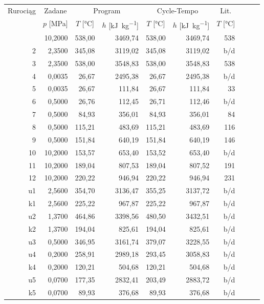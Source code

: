 \begin{longtable}{|*{10}{r|}}
	\hline
		\multirow{2}{*}{Rurociąg} &
		\multicolumn{1}{c|}{Zadane} &
		\multicolumn{2}{c|}{Program} &
		\multicolumn{2}{c|}{Cycle-Tempo} &
		\multicolumn{1}{c|}{Lit.} \\
	\cline{2-7}
		&
		\multicolumn{1}{c|}{$p$ [\si{\mega\pascal}]} &
		\multicolumn{1}{c|}{$T$ [\si{\degreeCelsius}]} &
		\multicolumn{1}{c|}{$h$ [\si{\kilo\joule\per\kilogram}]} &
		\multicolumn{1}{c|}{$T$ [\si{\degreeCelsius}]} &
		\multicolumn{1}{c|}{$h$ [\si{\kilo\joule\per\kilogram}]} &
		\multicolumn{1}{c|}{$T$ [\si{\degreeCelsius}]} \\
	\hline
	\endhead
	\hline
	\endfoot
		 1 & 10,2000 & 538,00 & 3469,74 & 538,00 & 3469,74 & 538 \\
		 2 &  2,3500 & 345,08 & 3119,02 & 345,08 & 3119,02 & b/d \\
		 3 &  2,3500 & 538,00 & 3548,83 & 538,00 & 3548,83 & 538 \\
		 4 &  0,0035 &  26,67 & 2495,38 &  26,67 & 2495,38 & b/d \\
		 5 &  0,0035 &  26,67 &  111,84 &  26,67 &  111,84 &  33 \\
		 6 &  0,5000 &  26,76 &  112,45 &  26,71 &  112,46 & b/d \\
		 7 &  0,5000 &  84,93 &  356,01 &  84,93 &  356,01 &  84 \\
		 8 &  0,5000 & 115,21 &  483,69 & 115,21 &  483,69 & 116 \\
		 9 &  0,5000 & 151,84 &  640,19 & 151,84 &  640,19 & 146 \\
		10 & 10,2000 & 153,57 &  653,40 & 153,52 &  653,40 & b/d \\
		11 & 10,2000 & 189,04 &  807,53 & 189,04 &  807,52 & 191 \\
		12 & 10,2000 & 220,22 &  946,94 & 220,22 &  946,94 & 231 \\
		u1 &  2,5600 & 354,70 & 3136,47 & 355,25 & 3137,72 & b/d \\
		k1 &  2,5600 & 225,22 &  967,87 & 225,22 &  967,87 & b/d \\
		u2 &  1,3700 & 464,86 & 3398,56 & 480,50 & 3432,51 & b/d \\
		k2 &  1,3700 & 194,04 &  825,61 & 194,04 &  825,61 & b/d \\
		u3 &  0,5000 & 346,95 & 3161,74 & 379,07 & 3228,55 & b/d \\
		u4 &  0,2000 & 258,91 & 2989,18 & 293,45 & 3058,83 & b/d \\
		k4 &  0,2000 & 120,21 &  504,68 & 120,21 &  504,68 & b/d \\
		u5 &  0,0700 & 177,35 & 2832,41 & 203,49 & 2883,72 & b/d \\
		k5 &  0,0700 &  89,93 &  376,68 &  89,93 &  376,68 & b/d \\
\end{longtable}

